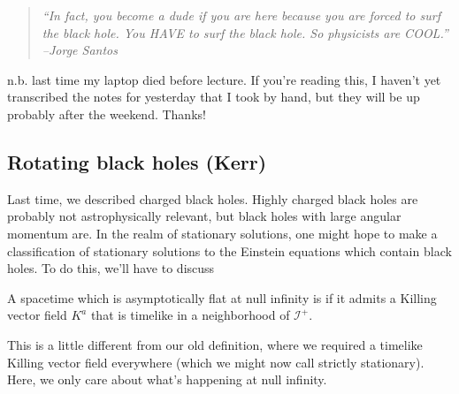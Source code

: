 \begin{quote}
    \textit{``In fact, you become a dude if you are here because you are forced to surf the black hole. You HAVE to surf the black hole. So physicists are COOL.'' --Jorge Santos}
\end{quote}

n.b. last time my laptop died before lecture. If you're reading this, I haven't yet transcribed the notes for yesterday that I took by hand, but they will be up probably after the weekend. Thanks!

\subsection*{Rotating black holes (Kerr)}
Last time, we described charged black holes. Highly charged black holes are probably not astrophysically relevant, but black holes with large angular momentum are. In the realm of stationary solutions, one might hope to make a classification of stationary solutions to the Einstein equations which contain black holes. To do this, we'll have to discuss 

\begin{defn}
    A spacetime which is asymptotically flat at null infinity is  if it admits a Killing vector field $K^a$ that is timelike in a neighborhood of $\mathcal{I}^+$.
\end{defn}
This is a little different from our old definition, where we required a timelike Killing vector field everywhere (which we might now call strictly stationary). Here, we only care about what's happening at null infinity.

